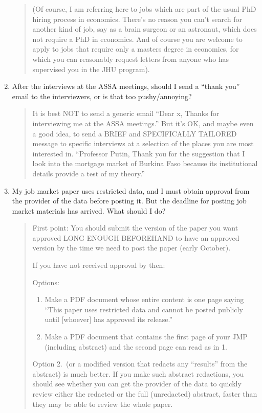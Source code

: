 \documentclass{\classes/econtex}
\begin{document}
\begin{enumerate}
\begin{quote}
    (Of course, I am referring here to jobs which are part of the usual PhD hiring 
    process in economics.  There's no reason you can't search for another kind of 
    job, say as a brain surgeon or an astronaut, which does not require a 
    PhD in economics.  And of course you are welcome to apply to jobs that require 
    only a masters degree in economics, for which you can reasonably request letters 
    from anyone who has supervised you in the JHU program).  

  \end{quote}

\item  After the interviews at the ASSA meetings, should I send a ``thank you'' email to the interviewers, or is that too pushy/annoying?
  \begin{quote}
    It is best NOT to send a generic email ``Dear x, Thanks for interviewing me at the ASSA meetings.''  But it's OK, and maybe even a good idea, to send a BRIEF and SPECIFICALLY TAILORED message to specific interviews at a selection of the places you are most interested in.  ``Professor Putin, Thank you for the suggestion that I look into the mortgage market of Burkina Faso because its institutional details provide a test of my theory.''

    \hypertarget{restricted-data}{}  
  \end{quote}

\item  My job market paper uses restricted data, and I must obtain approval from the provider of the data before posting it. But the deadline for posting job market materials has arrived. What should I do?

  \begin{quote}
    First point: You should submit the version of the paper you want approved LONG ENOUGH BEFOREHAND to have an approved version by the time we need to post the paper (early October).

    If you have not received approval by then:
    
      Options:
      \begin{enumerate}
      \item Make a PDF document whose entire content is one page saying ``This paper uses restricted data and cannot be posted publicly until [whoever] has approved its release.''
      \item Make a PDF document that contains the first page of your JMP (including abstract) and the second page can read as in 1.
      \end{enumerate}

    Option 2.\ (or a modified version that redacts any ``results'' from the abstract) is much better. If you make such abstract redactions, you should see whether you can get the provider of the data to quickly review either the redacted or the full (unredacted) abstract, faster than they may be able to review the whole paper.

  \end{quote}
\end{enumerate}
\end{document}
